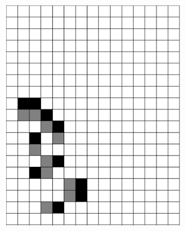 \documentclass[12pt]{article}
\numberwithin{figure}{section} %
\begin{document}
\begin{figure}[H]
\begin{subfigure}{0.3\textwidth}
     		\includegraphics[width=\linewidth]{Section4/29.1}
     		\subcaption{}
   	\end{subfigure}
        \begin{subfigure}{0.3\textwidth}
     		\centering

\end{subfigure}
\end{figure}
\end{document}
